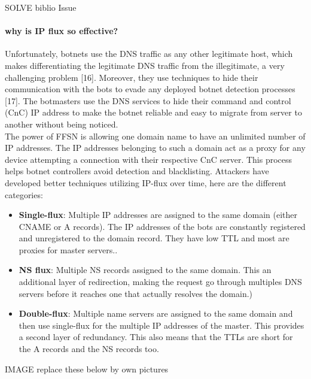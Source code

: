 SOLVE biblio Issue

\paragraph{why is IP flux so effective?} Unfortunately, botnets use the DNS traffic as any other legitimate host, which makes differentiating the legitimate DNS traffic from the illegitimate, a very challenging problem [16]. Moreover, they use techniques to hide their communication with the bots to evade any deployed botnet detection processes [17]. The  botmasters use the DNS services to hide their command and control (CnC) IP address to make the botnet reliable and easy to migrate from server to another without being noticed.
\\
The power of FFSN is allowing one domain name to have an unlimited number of IP addresses. The IP addresses belonging to such a domain act as a proxy for any device attempting a connection with their respective CnC server. This process helps botnet controllers avoid detection and blacklisting. Attackers have developed better techniques utilizing IP-flux over time, here are the different categories:
\begin{itemize}[noitemsep]
\item \textbf{Single-flux}: Multiple IP addresses are assigned to the same domain (either CNAME or A records). The IP addresses of the bots are constantly registered and unregistered to the domain record. They have low TTL and most are proxies for master servers.\cite{wiki_ff}.
\item \textbf{NS flux}: Multiple NS records assigned to the same domain. This an additional layer of redirection, making the request go through multiples DNS servers before it reaches one that actually resolves the domain.)
\item \textbf{Double-flux}: Multiple name servers are assigned to the same domain and then use single-flux for the multiple IP addresses of the master. This provides a second layer of redundancy. This also means that the TTLs are short for the A records and the NS records too.
\end{itemize}

IMAGE replace these below by own pictures

